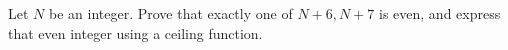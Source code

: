 Let $N$ be an integer. Prove that exactly one of $N+6,N+7$ is even, and express that even integer using a ceiling function.
